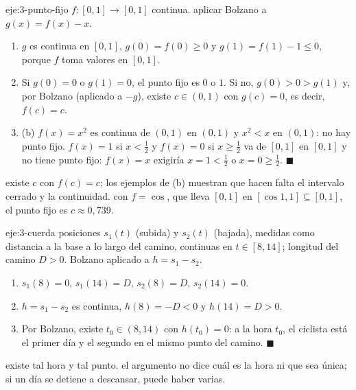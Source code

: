 \begin{solucion}{eje:3-punto-fijo}
\datos $f\colon[0,1]\to[0,1]$ continua.
\planteamiento aplicar Bolzano a $g(x)=f(x)-x$.
\pasos
\begin{enumerate}[label=\arabic*.]
  \item $g$ es continua en $[0,1]$, $g(0)=f(0)\ge0$ y $g(1)=f(1)-1\le0$, porque $f$ toma valores en $[0,1]$.
  \item Si $g(0)=0$ o $g(1)=0$, el punto fijo es $0$ o $1$. Si no, $g(0)>0>g(1)$ y, por Bolzano (aplicado a $-g$), existe $c\in(0,1)$ con $g(c)=0$, es decir, $f(c)=c$.
  \item (b) $f(x)=x^{2}$ es continua de $(0,1)$ en $(0,1)$ y $x^{2}<x$ en $(0,1)$: no hay punto fijo. $f(x)=1$ si $x<\frac12$ y $f(x)=0$ si $x\ge\frac12$ va de $[0,1]$ en $[0,1]$ y no tiene punto fijo: $f(x)=x$ exigiría $x=1<\frac12$ o $x=0\ge\frac12$. \hfill$\blacksquare$
\end{enumerate}
\resultado existe $c$ con $f(c)=c$; los ejemplos de (b) muestran que hacen falta el intervalo cerrado y la continuidad.
\comprobacion con $f=\cos$, que lleva $[0,1]$ en $[\cos1,1]\subseteq[0,1]$, el punto fijo es $c\approx0{,}739$.
\end{solucion}

\begin{solucion}{eje:3-cuerda}
\datos posiciones $s_1(t)$ (subida) y $s_2(t)$ (bajada), medidas como distancia a la base a lo largo del camino, continuas en $t\in[8,14]$; longitud del camino $D>0$.
\planteamiento Bolzano aplicado a $h=s_1-s_2$.
\pasos
\begin{enumerate}[label=\arabic*.]
  \item $s_1(8)=0$, $s_1(14)=D$, $s_2(8)=D$, $s_2(14)=0$.
  \item $h=s_1-s_2$ es continua, $h(8)=-D<0$ y $h(14)=D>0$.
  \item Por Bolzano, existe $t_0\in(8,14)$ con $h(t_0)=0$: a la hora $t_0$, el ciclista está el primer día y el segundo en el mismo punto del camino. \hfill$\blacksquare$
\end{enumerate}
\resultado existe tal hora y tal punto.
\comprobacion el argumento no dice cuál es la hora ni que sea única; si un día se detiene a descansar, puede haber varias.
\end{solucion}

